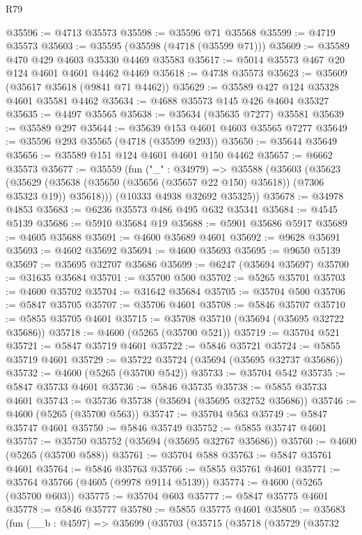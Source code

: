 \begin{lexlean}{R79}
\begin{coremodule}
@35596 := @4713 @35573
@35598 := @35596 @71 @35568
@35599 := @4719 @35573
@35603 := @35595 (@35598 (@4718 (@35599 @71)))
@35609 := @35589 @470 @429 @4603 @35330 @4469 @35583
@35617 := @5014 @35573 @467 @20 @124 @4601 @4601 @4462 @4469
@35618 := @4738 @35573
@35623 := @35609 (@35617 @35618 (@9841 @71 @4462))
@35629 := @35589 @427 @124 @35328 @4601 @35581 @4462
@35634 := @4688 @35573 @145 @426 @4604 @35327
@35635 := @4497 @35565
@35638 := @35634 (@35635 @7277) @35581
@35639 := @35589 @297
@35644 := @35639 @153 @4601 @4603 @35565 @7277
@35649 := @35596 @293 @35565 (@4718 (@35599 @293))
@35650 := @35644 @35649
@35656 := @35589 @151 @124 @4601 @4601 @150 @4462
@35657 := @6662 @35573
@35677 := @35559
    (fun ("_" : @34979) =>
    @35588
      (@35603
        (@35623
          (@35629 (@35638 (@35650 (@35656 (@35657 @22 @150) @35618)) (@7306 @35323 @19)) @35618)))
      (@10333 @4938 @32692 @35325))
@35678 := @34978 @4853
@35683 := @6236 @35573 @486 @495 @632 @35341
@35684 := @4545 @5139
@35686 := @5910 @35684 @19
@35688 := @5901 @35686 @5917
@35689 := @4605 @35688
@35691 := @4600 @35689 @4601
@35692 := @9628 @35691
@35693 := @4602 @35692
@35694 := @4600 @35693
@35695 := @9650 @5139
@35697 := @35695 @32707 @35686
@35699 := @6247 (@35694 @35697)
@35700 := @31635 @35684
@35701 := @35700 @500
@35702 := @5265 @35701
@35703 := @4600 @35702
@35704 := @31642 @35684
@35705 := @35704 @500
@35706 := @5847 @35705
@35707 := @35706 @4601
@35708 := @5846 @35707
@35710 := @5855 @35705 @4601
@35715 := @35708 @35710 (@35694 (@35695 @32722 @35686))
@35718 := @4600 (@5265 (@35700 @521))
@35719 := @35704 @521
@35721 := @5847 @35719 @4601
@35722 := @5846 @35721
@35724 := @5855 @35719 @4601
@35729 := @35722 @35724 (@35694 (@35695 @32737 @35686))
@35732 := @4600 (@5265 (@35700 @542))
@35733 := @35704 @542
@35735 := @5847 @35733 @4601
@35736 := @5846 @35735
@35738 := @5855 @35733 @4601
@35743 := @35736 @35738 (@35694 (@35695 @32752 @35686))
@35746 := @4600 (@5265 (@35700 @563))
@35747 := @35704 @563
@35749 := @5847 @35747 @4601
@35750 := @5846 @35749
@35752 := @5855 @35747 @4601
@35757 := @35750 @35752 (@35694 (@35695 @32767 @35686))
@35760 := @4600 (@5265 (@35700 @588))
@35761 := @35704 @588
@35763 := @5847 @35761 @4601
@35764 := @5846 @35763
@35766 := @5855 @35761 @4601
@35771 := @35764 @35766 (@4605 (@9978 @9114 @5139))
@35774 := @4600 (@5265 (@35700 @603))
@35775 := @35704 @603
@35777 := @5847 @35775 @4601
@35778 := @5846 @35777
@35780 := @5855 @35775 @4601
@35805 := @35683
    (fun (__b : @4597) =>
    @35699
      (@35703
        (@35715
          (@35718
            (@35729
              (@35732

\end{coremodule}
\end{lexlean}

